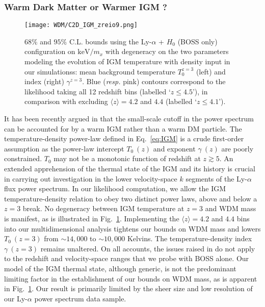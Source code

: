 \subsubsection{Warm Dark Matter or Warmer IGM ?}

\begin{figure}
\begin{center}
\texttt{[image: WDM/C2D\_IGM\_zreio9.png]}
\caption{ $68\%$ and $95\%$ C.L. bounds using the Ly-$\alpha$ + $H_0$ (BOSS only) configuration on $\mathrm{keV}/m_x$ with degeneracy on the two parameters modeling the evolution of IGM temperature with density input in our simulationss: mean background temperature $T_0^{z=3}$ (left) and index (right) $\gamma^{z=3}$. Blue (\textit{resp.} pink) contours correspond to the likelihood taking all 12 redshift bins (labelled `$z \leq 4.5$'), in comparison with excluding $\langle z \rangle = 4.2$ and $4.4$ (labelled `$z \leq 4.1$').}
\label{fig:Contour_T0gamma}
\end{center}
\end{figure}

It has been recently argued in \cite{warmIGM} that the small-scale cutoff in the power spectrum can be accounted for by a warm IGM rather than a warm DM particle. The temperature-density power-law defined in Eq.~\ref{eq:IGM} is a crude first-order assumption as the power-law intercept $T_0 \: (z)$ and exponent $\gamma \: (z)$ are poorly constrained. $T_0$ may not be a monotonic function of redshift at $z \gtrsim 5$. An extended apprehension of the thermal state of the IGM and its history is crucial in carrying out investigation in the lower velocity-space $k$ segments of the Ly-$\alpha$ flux power spectrum. In our likelihood computation, we allow the IGM temperature-density relation to obey two distinct power laws, above and below a $z=3$ break.
No degeneracy between IGM temperature at $z=3$ and WDM mass is manifest, as is illustrated in Fig.~\ref{fig:Contour_T0gamma}. Implementing the $\langle z \rangle = 4.2$ and $4.4$ bins into our multidimensional analysis tightens our bounds on WDM mass and lowers $T_0 \: (z=3)$ from $\sim 14,000$ to $\sim 10,000$ Kelvins. The temperature-density index $\gamma \: (z=3)$ remains unaltered. On all accounts, the issues raised in \cite{warmIGM} do not apply to the redshift and velocity-space ranges that we probe with BOSS alone. Our model of the IGM thermal state, although generic, is not the predominant limiting factor in the establishment of our bounds on WDM mass, as is apparent in Fig.~\ref{fig:Contour_T0gamma}. Our result is primarily limited by the sheer size and low resolution of our Ly-$\alpha$ power spectrum data sample.

